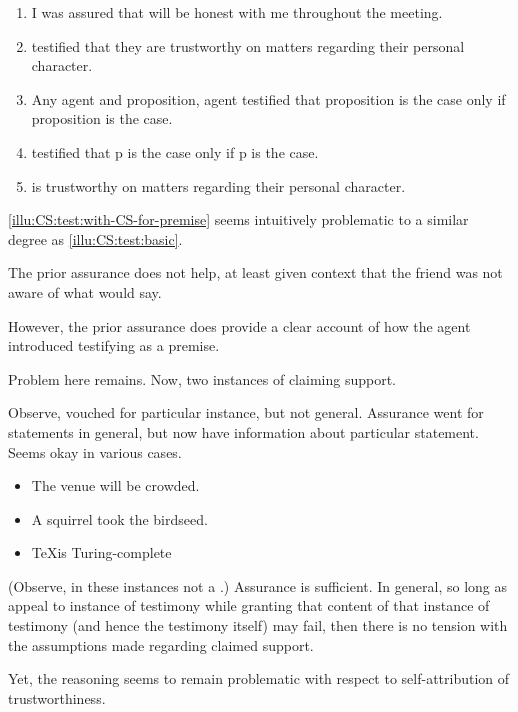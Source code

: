 \begin{note}[Testimony 2]
  \begin{illustration}[Testimony 2]
    \label{illu:CS:test:with-CS-for-premise}
    \mbox{}
    \begin{enumerate}[label=\arabic*., ref=(\arabic*)]
    \item I was assured that  will be honest with me throughout the meeting.
    \item\label{ex:eiS:tt:test}  testified that they are trustworthy on matters regarding their personal character.
    \item Any agent and proposition, agent testified that proposition is the case only if proposition is the case.
    \item {} testified that p is the case only if p is the case.
    \item\label{ex:eiS:tt:ok}  is trustworthy on matters regarding their personal character.
    \end{enumerate}
  \end{illustration}

  \autoref{illu:CS:test:with-CS-for-premise} seems intuitively problematic to a similar degree as \ref{illu:CS:test:basic}.

  The prior assurance does not help, at least given context that the friend was not aware of what  would say.

  However, the prior assurance does provide a clear account of how the agent introduced  testifying as a premise.
\end{note}

\begin{note}
  Problem here remains.
  Now, two instances of claiming support.

  Observe, vouched for particular instance, but not general.
  Assurance went for statements in general, but now have information about particular statement.
  Seems okay in various cases.

  \begin{itemize}
  \item The venue will be crowded.
  \item A squirrel took the birdseed.
  \item \TeX is Turing-complete
  \end{itemize}
  (Observe, in these instances not a \requ{}.)
  Assurance is sufficient.
  In general, so long as appeal to instance of testimony while granting that content of that instance of testimony (and hence the testimony itself) may fail, then there is no tension with the assumptions made regarding claimed support.

  Yet, the reasoning seems to remain problematic with respect to self-attribution of trustworthiness.
\end{note}

